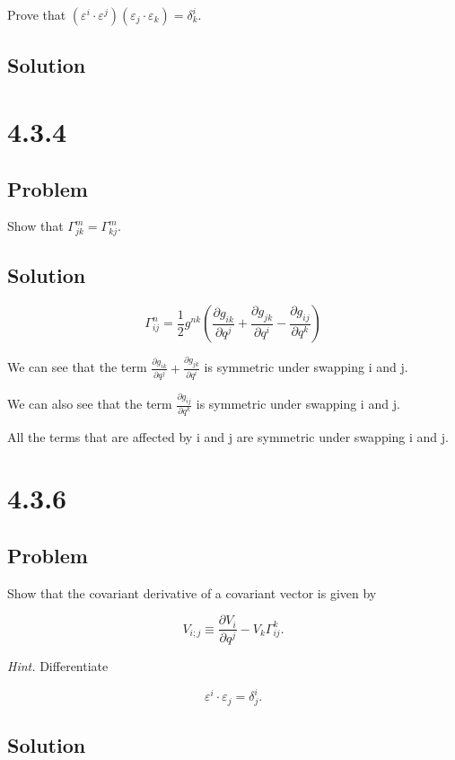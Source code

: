 \documentclass[12pt]{article}
\begin{document}
Prove that \((\varepsilon^i \cdot \varepsilon^j)(\varepsilon_j \cdot \varepsilon_k)=\delta^i_k\).

\subsection{Solution}

\newpage
\section{4.3.4}

\subsection{Problem}

Show that \(\Gamma^m_{jk}=\Gamma^m_{kj}\).

\subsection{Solution}

\[
    \Gamma_{i j}^n = \frac{1}{2} g^{n k} \left(\frac{\partial g_{i k}}{\partial q^j} + \frac{\partial g_{j k}}{\partial q^i} - \frac{\partial g_{i j}}{\partial q^k}\right)
\]

We can see that the term \(\frac{\partial g_{i k}}{\partial q^j} + \frac{\partial g_{j k}}{\partial q^i}\) is symmetric under swapping i and j.

We can also see that the term \(\frac{\partial g_{i j}}{\partial q^k}\) is symmetric under swapping i and j.

All the terms that are affected by i and j are symmetric under swapping i and j.

\newpage
\section{4.3.6}

\subsection{Problem}

Show that the covariant derivative of a covariant vector is given by

\[
    V_{i;j} \equiv \frac{\partial V_i}{\partial q^j} - V_k\Gamma^k_{ij}.
\]

\textit{Hint.} Differentiate

\[
    \varepsilon^i \cdot \varepsilon_j = \delta^i_j.
\]

\subsection{Solution}


\newpage


\nocite{arfken2013mathematical}
\nocite{El-Deeb_PEU-356_Assignments}
\end{document}
